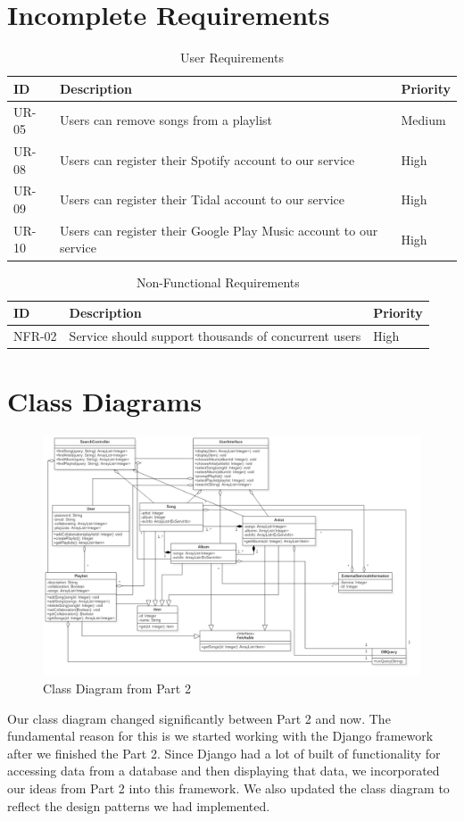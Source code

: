 \documentclass[12pt]{article}
\begin{document}
\section{Incomplete Requirements}
\begin{table}[H]
	\centering
	\label{tab:uri}
	\caption*{User Requirements}
	\begin{tabularx}{450pt}{lXl}
		ID & Description & Priority\\\hline
		UR-05 & Users can remove songs from a playlist & Medium \\
		UR-08 & Users can register their Spotify account to our service & High \\
		UR-09 & Users can register their Tidal account to our service & High \\
		UR-10 & Users can register their Google Play Music account to our service & High \\
	\end{tabularx}
\end{table}
\begin{table}[H]
	\centering
	\label{tab:nfri}
	\caption*{Non-Functional Requirements}
	\begin{tabularx}{450pt}{lXl}
		ID & Description & Priority\\\hline
		NFR-02 & Service should support thousands of concurrent users & High \\
	\end{tabularx}
\end{table}
\section{Class Diagrams}
\begin{figure}[H]
	\centering
	\includegraphics[scale=0.35]{MusicManagerClassDiagram.png}
	\caption{Class Diagram from Part 2}
	\label{fig:classDiagPart2}
\end{figure}
Our class diagram changed significantly between Part 2 and now. The fundamental reason for this is we started working with the Django framework after we finished the Part 2. Since Django had a lot of built of functionality for accessing data from a database and then displaying that data, we incorporated our ideas from Part 2 into this framework. We also updated the class diagram to reflect the design patterns we had implemented. 
\end{document}
